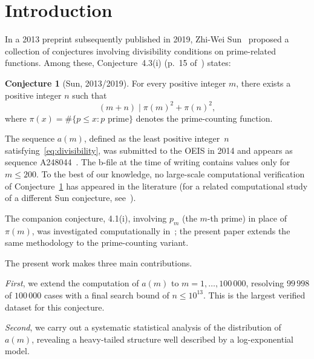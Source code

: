 \documentclass{amsart}
\theoremstyle{definition}
\newtheorem{conjecture}[theorem]{Conjecture}
\theoremstyle{remark}
\numberwithin{equation}{section}
\begin{document}
\maketitle

\section{Introduction}
\label{sec:intro}

In a 2013 preprint subsequently published in 2019,
Zhi-Wei Sun~\cite{Sun2019} proposed a collection of conjectures
involving divisibility conditions on prime-related functions.
Among these, Conjecture~4.3(i) (p.~15 of~\cite{Sun2019}) states:

\begin{conjecture}[Sun, 2013/2019]\label{conj:sun43i}
For every positive integer $m$, there exists a positive integer $n$
such that
\begin{equation}\label{eq:divisibility}
(m + n) \mid \pi(m)^2 + \pi(n)^2,
\end{equation}
where $\pi(x) = \#\{p \le x : p \text{ prime}\}$ denotes the
prime-counting function.
\end{conjecture}

The sequence $a(m)$, defined as the least positive integer~$n$
satisfying~\eqref{eq:divisibility}, was submitted to the OEIS in
2014 and appears as sequence A248044~\cite{OEIS_A248044}.
The b-file at the time of writing contains values only for
$m \le 200$.
To the best of our knowledge, no large-scale computational
verification of Conjecture~\ref{conj:sun43i} has appeared in the
literature (for a related computational study of a different Sun
conjecture, see~\cite{MacTsop2021}).

The companion conjecture, 4.1(i), involving $p_m$ (the $m$-th prime)
in place of $\pi(m)$, was investigated computationally
in~\cite{CortiA247975}; the present paper extends the same
methodology to the prime-counting variant.

The present work makes three main contributions.

\emph{First}, we extend the computation of $a(m)$ to
$m = 1, \ldots, 100\,000$, resolving $99\,998$ of $100\,000$ cases
with a final search bound of $n \le 10^{13}$.  This is the largest
verified dataset for this conjecture.

\emph{Second}, we carry out a systematic statistical analysis of the
distribution of $a(m)$, revealing a heavy-tailed structure well
described by a log-exponential model.
\end{document}
